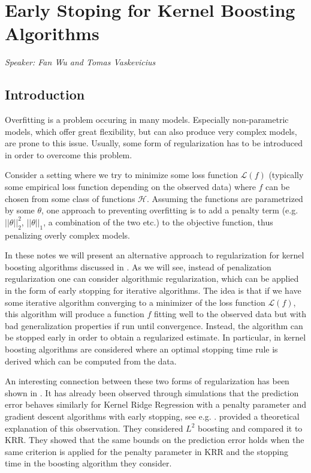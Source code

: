 
\chapter{Early Stoping for Kernel Boosting Algorithms}
\emph{Speaker: Fan Wu and Tomas Vaskevicius}\\


\section{Introduction}
Overfitting is a problem occuring in many models. Especially non-parametric models,
which offer great flexibility, but can also produce very complex models,
are prone to this issue. Usually, some form of regularization has to be introduced
in order to overcome this problem.

Consider a setting where we try to minimize some loss function $\mathcal{L}(f)$
(typically some empirical loss function depending on the observed data) where $f$
can be chosen from some class of functions $\mathcal{H}$. Assuming the
functions are parametrized by some $\theta$, one approach to preventing overfitting
is to add a penalty term (e.g. $||\theta||_2^2$, $||\theta||_1$, a combination of the two etc.)
to the objective function, thus penalizing overly complex models.

In these notes we will present an alternative approach to regularization for kernel boosting algorithms discussed in \cite{wei2017early}. As we will see, instead of penalization regularization one
can consider algorithmic regularization, which can be applied in the form of early stopping
for iterative algorithms. The idea is that if we have some iterative algorithm
converging to a minimizer of the loss function $\mathcal{L}(f)$, this algorithm will
produce a function $f$ fitting well to the observed data but with bad generalization properties
if run until convergence. Instead, the algorithm can be stopped early in order to obtain a regularized estimate.
In particular, in \cite{wei2017early} kernel boosting algorithms are considered
where an optimal stopping time rule is derived which can be computed from the data.

An interesting connection between these two forms of regularization has been shown in
\cite[Section 3.4]{raskutti2014early}.
It has already been observed through simulations that the prediction error behaves
similarly for Kernel Ridge Regression with a penalty parameter and gradient descent algorithms with early stopping, see e.g. \cite{friedman2004gradient}.
\citet{raskutti2014early} provided a theoretical explanation of this observation.
They considered $L^2$ boosting and compared it to KRR.
They showed that the same bounds on the prediction error holds when the same criterion
is applied for the penalty parameter in KRR and the stopping time in the boosting algorithm they consider.


